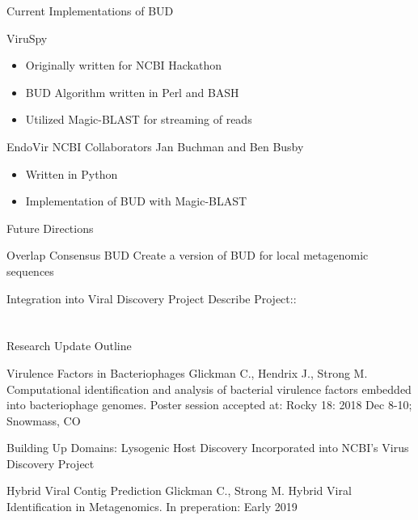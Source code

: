 \documentclass[11pt, xcolor=table]{beamer}
\begin{document}
	\begin{frame}{Current Implementations of BUD}
	\begin{block}{ViruSpy}
	\begin{itemize}
	\item Originally written for NCBI Hackathon
	\item BUD Algorithm written in Perl and BASH
	\item Utilized Magic-BLAST for streaming of reads 
	\end{itemize}
	\end{block}
	
	\begin{block}{EndoVir}
	NCBI Collaborators Jan Buchman and Ben Busby \\ 
	\begin{itemize}
	\item Written in Python
	\item Implementation of BUD with Magic-BLAST
	\end{itemize}
	\end{block}
	\end{frame}
	\begin{frame}{Future Directions}
	\begin{block}{Overlap Consensus BUD}
	Create a version of BUD for local metagenomic sequences 
	\end{block}
	
	\begin{block}{Integration into Viral Discovery Project}
  Describe Project::
	\end{block}
	\end{frame}
	
\section{}
	\begin{frame}{Research Update Outline}
	\begin{block}{\textcolor{black!50}{Virulence Factors in Bacteriophages}}
	\textcolor{black!50}{\tiny{Glickman C., Hendrix J., Strong M. Computational identification and analysis of bacterial virulence factors embedded into bacteriophage genomes. Poster session accepted at: Rocky 18: 2018 Dec 8-10; Snowmass, CO}}
	\end{block}
	
	\begin{block}{\textcolor{black!50}{Building Up Domains: Lysogenic Host Discovery}}
  \textcolor{black!50}{Incorporated into NCBI's Virus Discovery Project}
	\end{block}

	\begin{block}{Hybrid Viral Contig Prediction}
	\tiny{Glickman C., Strong M. Hybrid Viral Identification in Metagenomics. In preperation: Early 2019}
	\end{block}
	\end{frame}
	
\end{document}
